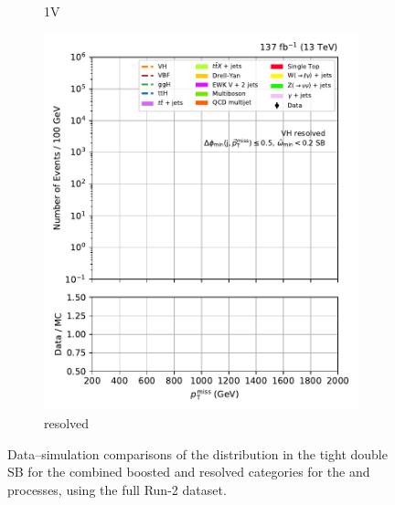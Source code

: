 \begin{figure}[htbp]
\begin{subfigure}[b]{0.24\textwidth}
        \caption{\VH 1V}
    \end{subfigure}
    \hfill
    \begin{subfigure}[b]{0.24\textwidth}
        \includegraphics[width=\textwidth]{figures/region_plots/full_Run2/sideband_0/VH_resolved.pdf}
        \caption{\VH resolved}
    \end{subfigure}
    \caption[Data--simulation comparisons of the \ptmiss distribution in the tight double sideband for the combined boosted and resolved categories for the \ttH and \VH processes, using the full Run-2 dataset]{Data--simulation comparisons of the \ptmiss distribution in the tight double \gls{SB} for the combined boosted and resolved categories for the \ttH and \VH processes, using the full Run-2 dataset.}
    \label{fig:htoinv_sb_yields_comb2016to18_tight_double}
\end{figure}

